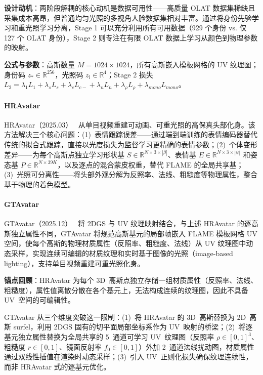 \textbf{设计动机}：两阶段解耦的核心动机是数据可用性——高质量 OLAT 数据集稀缺且采集成本高昂，但普通均匀光照的多视角人脸数据集相对丰富。通过将身份先验学习和重光照学习分离，Stage 1 可以充分利用所有可用数据（929 个身份 vs. 仅 127 个 OLAT 身份），Stage 2 则专注在有限 OLAT 数据上学习从颜色到物理参数的映射。

\textbf{公式与参数}：高斯数量 $M = 1024 \times 1024$，所有高斯嵌入模板网格的 UV 纹理图；身份码 $z_* \in \mathbb{R}^{256}$，光照码 $z_l \in \mathbb{R}^4$；Stage 2 损失 $L_2 = \lambda_1 L_1 + \lambda_s L_s + \lambda_c L_{c-} + \lambda_n L_n + \lambda_\rho L_\rho + \lambda_{mono} L_{mono}$。

\paragraph{HRAvatar}

HRAvatar（2025.03）~\cite{2503_08224} 从单目视频重建可动画、可重光照的高保真头部化身。该方法解决三个核心问题：(1)~表情跟踪误差——通过端到端训练的表情编码器替代传统的拟合式跟踪，直接以光度损失为监督学习更精确的表情参数；(2)~个体变形差异——为每个高斯点独立学习形状基 $S \in \mathbb{R}^{N \times 3 \times |\beta|}$、表情基 $E \in \mathbb{R}^{N \times 3 \times |\psi|}$ 和姿态基 $P \in \mathbb{R}^{N \times 39K}$，以及逐点的混合蒙皮权重，替代 FLAME 的全局共享基；(3)~光照可分离性——将头部外观分解为反照率、法线、粗糙度等物理属性，整合基于物理的着色模型。

\paragraph{GTAvatar}

GTAvatar（2025.12）~\cite{2512_09162} 将 2DGS 与 UV 纹理映射结合，与上述 HRAvatar 的逐高斯独立属性不同，GTAvatar 将规范高斯基元的局部帧嵌入 FLAME 模板网格 UV 空间，使每个高斯的物理材质属性（反照率、粗糙度、法线）从 UV 纹理图中动态采样，实现连续可编辑的材质纹理和实时基于图像的光照（image-based lighting），支持单目视频重建可重光照化身。

\textbf{锚点回顾}：HRAvatar 为每个 3D~高斯点独立存储一组材质属性（反照率、法线、粗糙度），属性值离散分散在各个基元上，无法构成连续的纹理图，因此不具备 UV~空间的可编辑性。

GTAvatar 从三个维度突破这一限制：(1)~将 HRAvatar 的 3D~高斯替换为 2D~高斯 surfel，利用 2DGS 固有的切平面局部坐标系作为 UV~映射的桥梁；(2)~将逐基元独立属性替换为全局共享的 5~通道可学习 UV~纹理图（反照率 $\rho \in [0,1]^3$、粗糙度 $r \in [0,1]$、镜面反射率 $f_0 \in [0,1]$）外加 2~通道法线扰动图，材质属性通过双线性插值在渲染时动态采样；(3)~引入 UV~正则化损失确保纹理连续性，而非 HRAvatar 式的逐基元优化。


